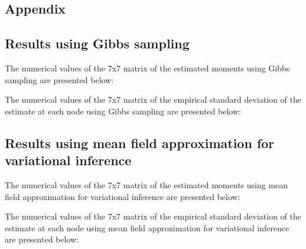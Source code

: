 \documentclass[11pt]{article}
\begin{document}
\begin{description}
\clearpage
\appendix
\section*{Appendix}

\subsection*{Results using Gibbs sampling}

The numerical values of the 7x7 matrix of the estimated moments using Gibbs sampling are presented below:


The numerical values of the 7x7 matrix of the empirical standard deviation of the estimate at each node using Gibbs sampling are presented below:


\subsection*{Results using mean field approximation for variational inference}

The numerical values of the 7x7 matrix of the estimated moments using mean field approximation for variational inference are presented below:


The numerical values of the 7x7 matrix of the empirical standard deviation of the estimate at each node using mean field approximation for variational inference are presented below:


\end{description}
\end{document}
